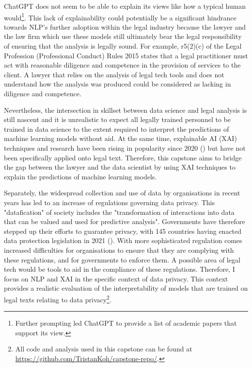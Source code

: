 ChatGPT does not seem to be able to explain its views like how a typical human would\footnote{Further prompting led ChatGPT to provide a list of academic papers that support its view.}. This lack of explainability could potentially be a significant hindrance towards NLP's further adoption within the legal industry because the lawyer and the law firm which use these models still ultimately bear the legal responsibility of ensuring that the analysis is legally sound. For example, r5(2)(c) of the Legal Profession (Professional Conduct) Rules 2015 states that a legal practitioner must act with reasonable diligence and competence in the provision of services to the client. A lawyer that relies on the analysis of legal tech tools and does not understand how the analysis was produced could be considered as lacking in diligence and competence.

Nevertheless, the intersection in skillset between data science and legal analysis is still nascent and it is unrealistic to expect all legally trained personnel to be trained in data science to the extent required to interpret the predictions of machine learning models without aid. At the same time, explainable AI (XAI) techniques and research have been rising in popularity since 2020 (\cite{linardatos2020}) but have not been specifically applied onto legal text. Therefore, this capstone aims to bridge the gap between the lawyer and the data scientist by using XAI techniques to explain the predictions of machine learning models. 

Separately, the widespread collection and use of data by organisations in recent years has led to an increase of regulations governing data privacy. This "datafication" of society includes the "transformation of interactions into data that can be valued and used for predictive analysis". Governments have therefore stepped up their efforts to guarantee privacy, with 145 countries having enacted data protection legislation in 2021 (\cite{gstrein2022}). With more sophisticated regulation comes increased difficulties for organisations to ensure that they are complying with these regulations, and for governments to enforce them. A possible area of legal tech would be tools to aid in the compliance of these regulations. Therefore, I focus on NLP and XAI in the specific context of data privacy. This context provides a realistic evaluation of the interpretability of models that are trained on legal texts relating to data privacy\footnote{All code and analysis used in this capstone can be found at \url{https://github.com/TristanKoh/capstone-repo/}.}.

